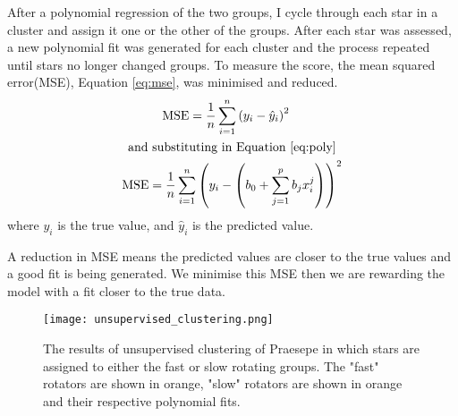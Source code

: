 \documentclass[fleqn,usenatbib]{mnras}
\begin{document}
After a polynomial regression of the two groups, I cycle through each star in a cluster and assign it one or the other of the groups.
After each star was assessed, a new polynomial fit was generated for each cluster and the process repeated until stars no longer changed groups.
To measure the score, the mean squared error(MSE), Equation \ref{eq:mse}, was minimised and reduced.
\begin{gather}
	\begin{aligned}
		\label{eq:mse}
		\textup{MSE} &= \frac{1}{n}\sum_{i=1}^n \left(y_i - \hat{y}_i\right)^2
	\end{aligned}
	\\
	\begin{aligned}
		\textup{and substituting in Equation \ref{eq:poly}}\nonumber
	\end{aligned}
	\\
	\begin{aligned}
		\textup{MSE} = \frac{1}{n}\sum_{i = 1}^n \left(y_i - \left(b_0 + \sum_{j = 1}^p b_jx_i^j\right) \right)^2
	\end{aligned}
\end{gather}
where $y_i$ is the true value, and $\hat{y}_i$ is the predicted value.
	
A reduction in MSE means the predicted values are closer to the true values and a good fit is being generated.
We minimise this MSE then we are rewarding the model with a fit closer to the true data.

\begin{figure}
	\texttt{[image: unsupervised\_clustering.png]}
	\caption{The results of unsupervised clustering of Praesepe in which stars are assigned to either the fast or slow rotating groups. The "fast" rotators are shown in orange, "slow" rotators are shown in orange and their respective polynomial fits.}
	\label{fig:unsupervised_clustering}
\end{figure}
\end{document}
